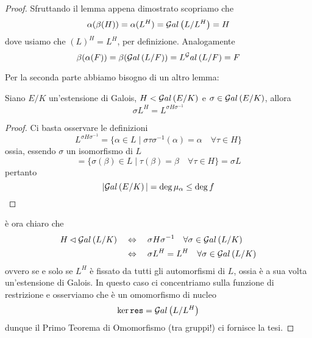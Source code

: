 \begin{multicols}{2}
\begin{proof}
	Sfruttando il lemma appena dimostrato scopriamo che
	\[ \alpha(\beta(H)) = \alpha(L^H) = \mathcal{G}al\left( L/L^H \right) = H \]
	dove usiamo che $ (L)^H = L^H $, per definizione. Analogamente
	\[ \beta(\alpha(F)) = \beta(\mathcal{G}al\left( L/F \right)) = L^\mathcal{G}al\left( L/F \right) = F \] 
	
	Per la seconda parte abbiamo bisogno di un altro lemma:
	\begin{prop}
		Siano $ E/K $ un'estensione di Galois, $ H < \mathcal{G}al\left( E/K \right) $ e $ \sigma \in \mathcal{G}al\left( E/K \right) $, allora
		\[ \sigma L^H = L^{\sigma H \sigma^{-1}} \]
	\end{prop}
	\begin{proof}
		Ci basta osservare le definizioni
		\[ L^{\sigma H \sigma^{-1}} = \{ \alpha \in L \mid \sigma\tau\sigma^{-1}(\alpha) = \alpha \quad\forall \tau \in H \} \]
		ossia, essendo $ \sigma $ un isomorfismo di $ L $
		\[ = \{ \sigma(\beta) \in L \mid \tau(\beta) = \beta \quad\forall \tau \in H \} = \sigma L \]
		pertanto
		\[ |\mathcal{G}al\left( E/K \right)| = \deg\mu_\alpha \leq \deg f \]
	\end{proof}
	è ora chiaro che
	\begin{align*}
		H \lhd \mathcal{G}al\left( L/K \right) &\quad\Leftrightarrow\quad \sigma H \sigma^{-1} \quad \forall\sigma \in \mathcal{G}al\left( L/K \right) \\
		& \quad\Leftrightarrow\quad \sigma L^H = L^H \quad \forall\sigma \in \mathcal{G}al\left( L/K \right)
	\end{align*}
	ovvero se e solo se $ L^H $ è fissato da tutti gli automorfismi di $ L $, ossia è a sua volta un'estensione di Galois.
	In questo caso ci concentriamo sulla funzione di restrizione
	e osserviamo che è un omomorfismo di nucleo
	\[ \ker \texttt{res} = \mathcal{G}al\left( L/L^H \right) \]
	dunque il Primo Teorema di Omomorfismo (tra gruppi!) ci fornisce la tesi.
	\end{proof}
	
	
\end{multicols}